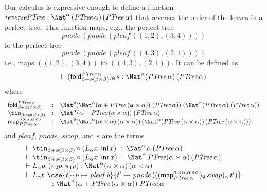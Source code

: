 \documentclass{lmcs}
\theoremstyle{plain}\newtheorem{satz}[thm]{Satz}
\newcommand{\inl}{\mathsf{inl}}
\newcommand{\inr}{\mathsf{inr}}
\newcommand{\fold}{\mathsf{fold}}
\newcommand{\map}{\mathsf{map}}
\begin{document}
\vspace*{0.1in}

Our calculus is expressive enough to define a function
$\mathit{reversePTree :
  \Nat^\alpha\,(\mathit{PTree}\,\alpha)\,(\mathit{PTree}\,\alpha)}$
that reverses the order of the leaves in a perfect tree. This function
maps, e.g., the perfect tree
\[\mathit{pnode}\,(\mathit{pnode}\,(\mathit{pleaf}\,
((1, 2), (3, 4))))\]
to the perfect tree
\[\mathit{pnode}\,(\mathit{pnode}\,(\mathit{pleaf}\,
((4, 3), (2, 1))))\]
i.e., maps $((1,2),(3,4))$
to $((4,3),(2,1))$.  It can be defined as
\[\vdash (\fold_{\beta + \phi(\beta \times \beta)}^{\mathit{PTree}\,
  \alpha})_\emptyset \, s : \Nat^{\alpha}
(\mathit{PTree}\,\alpha)\,(\mathit{PTree}\,\alpha)\] where
\[\begin{array}{lll}
\fold_{\beta + \phi(\beta \times \beta)}^{\mathit{PTree}\,\alpha} & :
& \Nat^{\emptyset} (\Nat^{\alpha} (\alpha + \mathit{PTree}\,(\alpha
\times \alpha)) \; (\mathit{PTree}\,\alpha))\; (\Nat^{\alpha}
(\mathit{PTree}\,\alpha) \; (\mathit{PTree}\,\alpha))\\
\tin_{\beta + \phi(\beta \times \beta)} & : & \Nat^{\alpha} (\alpha +
\mathit{PTree}\,(\alpha \times \alpha)) \; (\mathit{PTree}\, \alpha)\\
\map_{\mathit{PTree}\,\alpha}^{\alpha \times \alpha, \alpha \times
  \alpha} & : & \Nat^\emptyset
(\Nat^{\alpha} (\alpha \times \alpha)\, (\alpha \times
\alpha))\,
(\Nat^{\alpha} (\mathit{PTree}\,(\alpha \times
\alpha))\, (\mathit{PTree}\,(\alpha \times \alpha)))
\end{array}\]
and 
$\mathit{pleaf}$, $\mathit{pnode}$, $\mathit{swap}$, and $s$ are the terms
\[\begin{array}{l}
\vdash \tin_{\beta + \phi (\beta \times \beta)} \circ (
L_{\alpha} x.\, \inl\, x) \; : \; \Nat^{\alpha}\, \alpha\,
(\mathit{PTree}\,\alpha)\\ 
\vdash \tin_{\beta + \phi (\beta \times \beta)} \circ (
L_{\alpha} x.\, \inr\, x) \; : \; \Nat^{\alpha}\, \mathit{PTree}
(\alpha \times \alpha)\,(\mathit{PTree}\,\alpha)\\ 
\vdash L_{\alpha} p.\, (\pi_2 p, \pi_1 p) :
\Nat^{\alpha} (\alpha \times \alpha)\, (\alpha \times \alpha)\\
\vdash L_{\alpha} t. \,\cse{t}{b \mapsto
 \mathit{pleaf}\, b}{t' \mapsto \mathit{pnode}\, 
    (((\map_{\mathit{PTree}\,\alpha}^{\alpha \times \alpha, \alpha \times
      \alpha})_\emptyset\, \mathit{swap})_\alpha\, t')}\\
\hspace*{0.5in}:  \Nat^{\alpha} (\alpha + \mathit{PTree}\,(\alpha \times
\alpha))\; \mathit{PTree}\,\alpha
\end{array}\]
\end{document}
